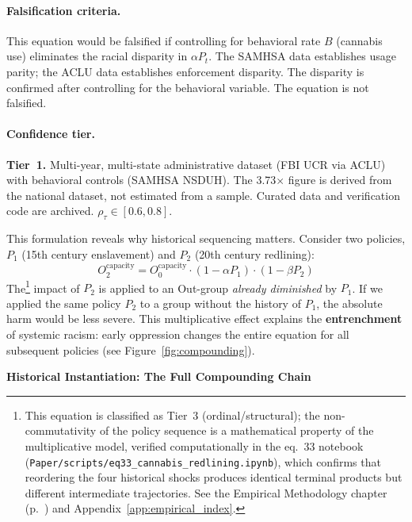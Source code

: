 \paragraph{Falsification criteria.}
This equation would be falsified if controlling for behavioral rate $B$ (cannabis use) eliminates the racial disparity in $\alpha P_t$. The SAMHSA data establishes usage parity; the ACLU data establishes enforcement disparity. The disparity is confirmed after controlling for the behavioral variable. The equation is not falsified.

\paragraph{Confidence tier.}
\textbf{Tier~1.} Multi-year, multi-state administrative dataset (FBI UCR via ACLU) with behavioral controls (SAMHSA NSDUH). The 3.73$\times$ figure is derived from the national dataset, not estimated from a sample. Curated data and verification code are archived. $\rho_\tau \in [0.6, 0.8]$.

This formulation reveals why historical sequencing matters. Consider two policies, $P_1$ (15th century enslavement) and $P_2$ (20th century redlining):
\begin{equation}\label{eq:6.7-policy-sequence-noncommutative}
O_2^{\text{capacity}} = O_0^{\text{capacity}} \cdot (1 - \alpha P_1) \cdot (1 - \beta P_2)
\end{equation}
The\footnote{This equation is classified as Tier~3 (ordinal/structural); the non-commutativity of the policy sequence is a mathematical property of the multiplicative model, verified computationally in the eq.~33 notebook (\texttt{Paper/scripts/eq33\_cannabis\_redlining.ipynb}), which confirms that reordering the four historical shocks produces identical terminal products but different intermediate trajectories. See the Empirical Methodology chapter (p.~\pageref{ch:empirical_methodology}) and Appendix~\ref{app:empirical_index}.} impact of $P_2$ is applied to an Out-group \textit{already diminished} by $P_1$. If we applied the same policy $P_2$ to a group without the history of $P_1$, the absolute harm would be less severe. This multiplicative effect explains the \textbf{entrenchment} of systemic racism: early oppression changes the entire equation for all subsequent policies (see Figure~\ref{fig:compounding}).

\textbf{Historical Instantiation: The Full Compounding Chain}

